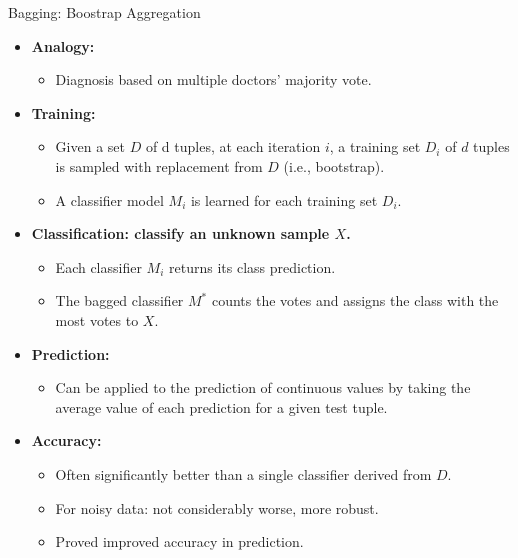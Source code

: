 \begin{frame}{Bagging: Boostrap Aggregation}
  \begin{itemize}
  \item \textbf{Analogy:}
    \begin{itemize}
    \item Diagnosis based on multiple doctors' majority vote.
    \end{itemize}
  \item \textbf{Training:}
    \begin{itemize}
    \item Given a set $D$ of d tuples, at each iteration $i$, a training set $D_i$ of $d$ tuples is sampled with replacement from $D$ (i.e., bootstrap).
    \item A classifier model $M_i$ is learned for each training set $D_i$.
    \end{itemize}
  \item \textbf{Classification: classify an unknown sample $X$.}
    \begin{itemize}
    \item Each classifier $M_i$ returns its class prediction.
    \item The bagged classifier $M^*$ counts the votes and assigns the class with the most votes to $X$.
    \end{itemize}
  \item \textbf{Prediction:}
    \begin{itemize}
    \item Can be applied to the prediction of continuous values by taking the average value of each prediction for a given test tuple.
    \end{itemize}
  \item \textbf{Accuracy:}
    \begin{itemize}
    \item Often significantly better than a single classifier derived from $D$.
    \item For noisy data: not considerably worse, more robust.
    \item Proved improved accuracy in prediction.
    \end{itemize}
  \end{itemize}
\end{frame}

